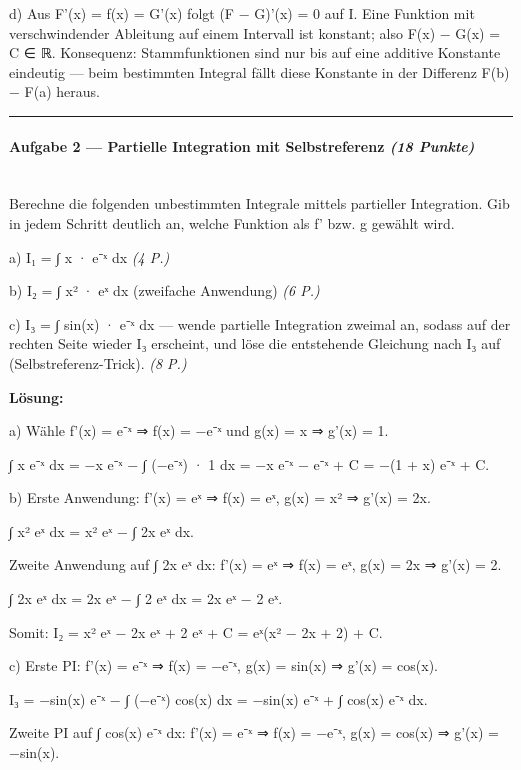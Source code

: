 \documentclass[11pt, a4paper]{article}
\begin{document}
d) Aus F'(x) = f(x) = G'(x) folgt (F − G)'(x) = 0 auf I. Eine Funktion mit verschwindender Ableitung auf einem Intervall ist konstant; also F(x) − G(x) = C ∈ ℝ. Konsequenz: Stammfunktionen sind nur bis auf eine additive Konstante eindeutig — beim bestimmten Integral fällt diese Konstante in der Differenz F(b) − F(a) heraus.



\noindent\textcolor{rulegray}{\rule{\linewidth}{0.4pt}}


\paragraph{Aufgabe 2 — Partielle Integration mit Selbstreferenz \textit{(18 Punkte)}}\mbox{}\\[2pt]

Berechne die folgenden unbestimmten Integrale mittels partieller Integration. Gib in jedem Schritt deutlich an, welche Funktion als f' bzw. g gewählt wird.


a) I₁ = ∫ x · e⁻ˣ dx \textit{(4 P.)}


b) I₂ = ∫ x² · eˣ dx (zweifache Anwendung) \textit{(6 P.)}


c) I₃ = ∫ sin(x) · e⁻ˣ dx — wende partielle Integration zweimal an, sodass auf der rechten Seite wieder I₃ erscheint, und löse die entstehende Gleichung nach I₃ auf (Selbstreferenz-Trick). \textit{(8 P.)}


\textbf{Lösung:}


a) Wähle f'(x) = e⁻ˣ ⇒ f(x) = −e⁻ˣ und g(x) = x ⇒ g'(x) = 1.

∫ x e⁻ˣ dx = −x e⁻ˣ − ∫ (−e⁻ˣ) · 1 dx = −x e⁻ˣ − e⁻ˣ + C = −(1 + x) e⁻ˣ + C.


b) Erste Anwendung: f'(x) = eˣ ⇒ f(x) = eˣ, g(x) = x² ⇒ g'(x) = 2x.

∫ x² eˣ dx = x² eˣ − ∫ 2x eˣ dx.

Zweite Anwendung auf ∫ 2x eˣ dx: f'(x) = eˣ ⇒ f(x) = eˣ, g(x) = 2x ⇒ g'(x) = 2.

∫ 2x eˣ dx = 2x eˣ − ∫ 2 eˣ dx = 2x eˣ − 2 eˣ.

Somit: I₂ = x² eˣ − 2x eˣ + 2 eˣ + C = eˣ(x² − 2x + 2) + C.


c) Erste PI: f'(x) = e⁻ˣ ⇒ f(x) = −e⁻ˣ, g(x) = sin(x) ⇒ g'(x) = cos(x).

I₃ = −sin(x) e⁻ˣ − ∫ (−e⁻ˣ) cos(x) dx = −sin(x) e⁻ˣ + ∫ cos(x) e⁻ˣ dx.


Zweite PI auf ∫ cos(x) e⁻ˣ dx: f'(x) = e⁻ˣ ⇒ f(x) = −e⁻ˣ, g(x) = cos(x) ⇒ g'(x) = −sin(x).
\end{document}
